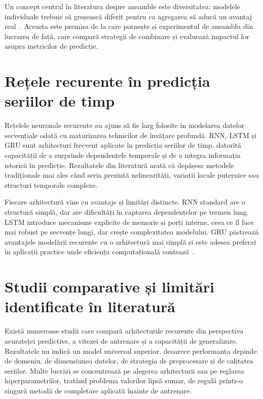 Un concept central în literatura despre ansamble este diversitatea: modelele individuale trebuie să greșească diferit pentru ca agregarea să aducă un avantaj real~\cite{dietterich2000ensemble}. Aceasta este premisa de la care pornește și experimentul de ansamblu din lucrarea de față, care compară strategii de combinare și evaluează impactul lor asupra metricilor de predicție.

\section{Rețele recurente în predicția seriilor de timp}

Rețelele neuronale recurente au ajuns să fie larg folosite în modelarea datelor secvențiale odată cu maturizarea tehnicilor de învățare profundă. RNN, LSTM și GRU sunt arhitecturi frecvent aplicate în predicția seriilor de timp, datorită capacității de a surprinde dependențele temporale și de a integra informația istorică în predicție. Rezultatele din literatură arată că depășesc metodele tradiționale mai ales când seria prezintă nelinearități, variații locale puternice sau structuri temporale complexe.

Fiecare arhitectură vine cu avantaje și limitări distincte. RNN standard are o structură simplă, dar are dificultăți în captarea dependențelor pe termen lung. LSTM introduce mecanisme explicite de memorie și porți interne, ceea ce îl face mai robust pe secvențe lungi, dar crește complexitatea modelului. GRU păstrează avantajele modelării recurente cu o arhitectură mai simplă și este adesea preferat în aplicații practice unde eficiența computațională contează~\cite{sherstinsky2020rnn, yu2019lstmreview, korstanje2025gru, cho2014gru}.

\section{Studii comparative și limitări identificate în literatură}

Există numeroase studii care compară arhitecturile recurente din perspectiva acurateței predictive, a vitezei de antrenare și a capacității de generalizare. Rezultatele nu indică un model universal superior, deoarece performanța depinde de domeniu, de dimensiunea datelor, de strategia de preprocesare și de calitatea seriilor. Multe lucrări se concentrează pe alegerea arhitecturii sau pe reglarea hiperparametrilor, tratând problema valorilor lipsă sumar, de regulă printr-o singură metodă de completare aplicată înainte de antrenare.

